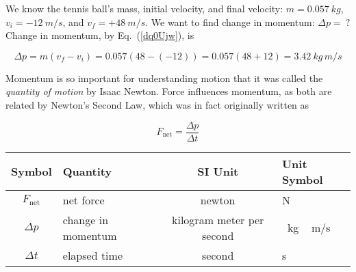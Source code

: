 \documentclass[main.tex]{subfiles}
\begin{document}
\begin{center}
%
%
\end{center}

\Solution We know the tennis ball's mass, initial velocity, and final velocity: $m = \SI{0.057}{kg}$, $v_i = -\SI{12}{m/s}$, and $v_f = +\SI{48}{m/s}$. We want to find change in momentum: $\Delta p =\ ?$ Change in momentum, by Eq.~(\ref{dq0Ujw}), is

\begin{equation*}
    \Delta p  = m \left(v_f - v_i\right) = 0.057 \left(48 - \left(-12\right) \right) = 0.057 \left(48 + 12 \right) = \SI{3.42}{kg\,m/s}
\end{equation*}

\cyanhrule

Momentum is so important for understanding motion that it was called the \textit{quantity of motion} by Isaac Newton. Force influences momentum, as both are related by Newton's Second Law, which was in fact originally written as

\begin{equation} \label{e8sC6q}
    F_{\text{net}} = \frac{\Delta p}{\Delta t}
\end{equation}

\begin{center}
    \begin{tabular}{cl|cl}
    \hline
    \textbf{Symbol} & \textbf{Quantity} & \textbf{SI Unit} & \textbf{Unit Symbol}  \\
    \hline\hline
    \rule{0pt}{2.5ex}
        $F_{\text{net}}$ & net force & newton & N\\
        $\Delta p$ & change in momentum & kilogram meter per second & \SI{}{kg\,m/s}\\
        $\Delta t$ & elapsed time & second & s\\
    \hline
    \end{tabular}
\end{center}
\end{document}
